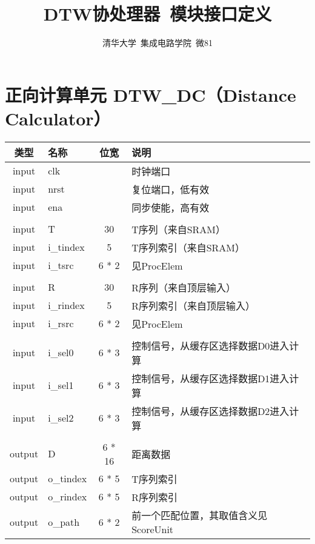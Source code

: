 \documentclass[UTF8]{ctexart}
\title{\huge{\heiti DTW协处理器\ 模块接口定义}}
\author{
\small{\kaishu 清华大学\ 集成电路学院\ 微81}
}
\date{}
\begin{document}
\maketitle

\section{正向计算单元 DTW\_DC（Distance Calculator）}

\begin{table}[!h]
    \centering
    \begin{tabular}{clcl}
        \toprule
        类型 & 名称 & 位宽 & 说明 \\
        \midrule
        input & clk && 时钟端口 \\[5pt]
        input & nrst && 复位端口，低有效 \\[5pt]
        input & ena && 同步使能，高有效 \\[5pt]
        \\
        input & T & 30 & T序列（来自SRAM） \\[5pt]
        input & i\_tindex & 5 & T序列索引（来自SRAM） \\[5pt]
        input & i\_tsrc & 6 * 2 & 见ProcElem \\[5pt]
        \\
        input & R & 30 & R序列（来自顶层输入） \\[5pt]
        input & i\_rindex & 5 & R序列索引（来自顶层输入） \\[5pt]
        input & i\_rsrc & 6 * 2 & 见ProcElem \\[5pt]
        \\
        input & i\_sel0 & 6 * 3 & 控制信号，从缓存区选择数据D0进入计算 \\[5pt]
        input & i\_sel1 & 6 * 3 & 控制信号，从缓存区选择数据D1进入计算 \\[5pt]
        input & i\_sel2 & 6 * 3 & 控制信号，从缓存区选择数据D2进入计算 \\[5pt]
        \\
        output & D & 6 * 16 & 距离数据 \\[5pt]
        output & o\_tindex & 6 * 5 & T序列索引 \\[5pt]
        output & o\_rindex & 6 * 5 & R序列索引 \\[5pt]
        output & o\_path & 6 * 2 & 前一个匹配位置，其取值含义见ScoreUnit \\[5pt]
        \bottomrule
    \end{tabular}
\end{table}
\end{document}
